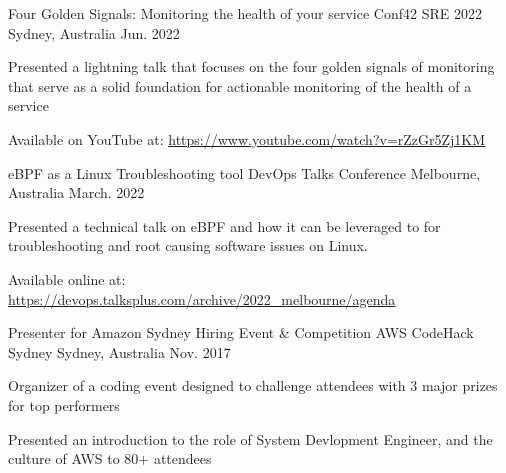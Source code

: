 

\begin{cventries}

  \cventry
    {Four Golden Signals: Monitoring the health of your service} %
    {Conf42 SRE 2022} %
    {Sydney, Australia} %
    {Jun. 2022} %
    {
      \begin{cvitems} %
        \item {Presented a lightning talk that focuses on the four golden signals of monitoring that serve as a solid foundation for actionable monitoring of the health of a service}
        \item {Available on YouTube at: \url{https://www.youtube.com/watch?v=rZzGr5Zj1KM}}
      \end{cvitems}
    }

  \cventry
    {eBPF as a Linux Troubleshooting tool} %
    {DevOps Talks Conference} %
    {Melbourne, Australia} %
    {March. 2022} %
    {
      \begin{cvitems} %
        \item {Presented a technical talk on eBPF and how it can be leveraged to for troubleshooting and root causing software issues on Linux.}
        \item {Available online at: \url{https://devops.talksplus.com/archive/2022_melbourne/agenda}}
      \end{cvitems}
    }


  \cventry
    {Presenter for Amazon Sydney Hiring Event \& Competition} %
    {AWS CodeHack Sydney} %
    {Sydney, Australia} %
    {Nov. 2017} %
    {
      \begin{cvitems} %
        \item {Organizer of a coding event designed to challenge attendees with 3 major prizes for top performers}
        \item {Presented an introduction to the role of System Devlopment Engineer, and the culture of AWS to 80+ attendees}
      \end{cvitems}
    }


\end{cventries}
